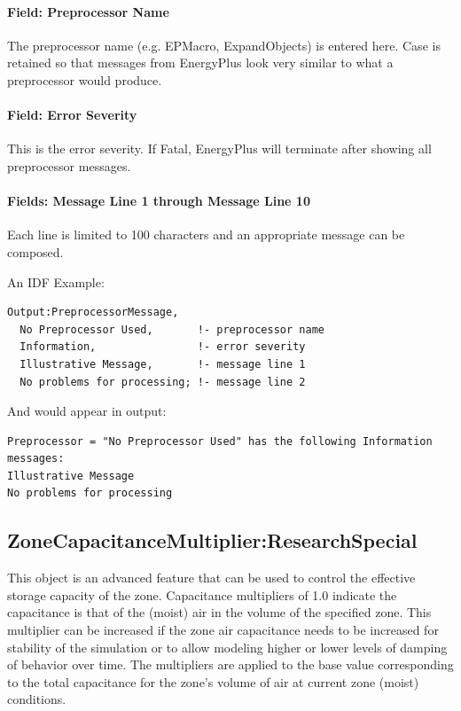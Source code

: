 \paragraph{Field: Preprocessor Name}\label{field-preprocessor-name}

The preprocessor name (e.g. EPMacro, ExpandObjects) is entered here. Case is retained so that messages from EnergyPlus look very similar to what a preprocessor would produce.

\paragraph{Field: Error Severity}\label{field-error-severity}

This is the error severity. If Fatal, EnergyPlus will terminate after showing all preprocessor messages.

\paragraph{Fields: Message Line 1 through Message Line 10}\label{fields-message-line-1-through-message-line-10}

Each line is limited to 100 characters and an appropriate message can be composed.

An IDF Example:

\begin{lstlisting}
Output:PreprocessorMessage,
  No Preprocessor Used,       !- preprocessor name
  Information,                !- error severity
  Illustrative Message,       !- message line 1
  No problems for processing; !- message line 2
\end{lstlisting}

And would appear in output:

\begin{lstlisting}
Preprocessor = "No Preprocessor Used" has the following Information messages:
Illustrative Message
No problems for processing
\end{lstlisting}

\subsection{ZoneCapacitanceMultiplier:ResearchSpecial}\label{zonecapacitancemultiplierresearchspecial}

This object is an advanced feature that can be used to control the effective storage capacity of the zone. Capacitance multipliers of 1.0 indicate the capacitance is that of the (moist) air in the volume of the specified zone. This multiplier can be increased if the zone air capacitance needs to be increased for stability of the simulation or to allow modeling higher or lower levels of damping of behavior over time. The multipliers are applied to the base value corresponding to the total capacitance for the zone's volume of air at current zone (moist) conditions.

